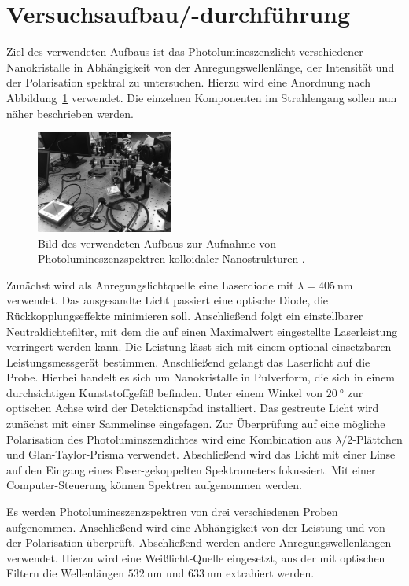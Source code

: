 \section{Versuchsaufbau/-durchführung}
Ziel des verwendeten Aufbaus ist das Photolumineszenzlicht verschiedener Nanokristalle in Abhängigkeit
von der Anregungswellenlänge, der Intensität und der Polarisation spektral zu untersuchen.
Hierzu wird eine Anordnung nach Abbildung~\ref{fig: aufbau} verwendet. Die einzelnen Komponenten
im Strahlengang sollen nun näher beschrieben werden.

\begin{figure}
  \centering
  \includegraphics[width = 0.4\textwidth]{pics/setup_pl.png}
  \caption{Bild des verwendeten Aufbaus zur Aufnahme von Photolumineszenzspektren kolloidaler
  Nanostrukturen \cite{anleitung_pl}.}
  \label{fig: aufbau}
\end{figure}

Zunächst wird als Anregungslichtquelle eine Laserdiode mit $\lambda = \SI{405}{\nano\meter}$ verwendet.
Das ausgesandte Licht passiert eine optische Diode, die Rückkopplungseffekte minimieren soll.
Anschließend folgt ein einstellbarer Neutraldichtefilter, mit dem die auf einen Maximalwert eingestellte Laserleistung
verringert werden kann. Die Leistung lässt sich mit einem optional einsetzbaren Leistungsmessgerät bestimmen.
Anschließend gelangt das Laserlicht auf die Probe. Hierbei handelt es sich um Nanokristalle in Pulverform, die sich in
einem durchsichtigen Kunststoffgefäß befinden. Unter einem Winkel von $\SI{20}{\degree}$ zur optischen Achse wird der
Detektionspfad installiert. Das gestreute Licht wird zunächst mit einer Sammelinse eingefagen. Zur Überprüfung auf eine
mögliche Polarisation des Photoluminszenzlichtes wird eine Kombination aus $\lambda / 2$-Plättchen und
Glan-Taylor-Prisma verwendet. 
Abschließend wird das Licht mit einer Linse auf den Eingang eines Faser-gekoppelten
Spektrometers fokussiert. Mit einer Computer-Steuerung können Spektren aufgenommen werden.

Es werden Photolumineszenzspektren von drei verschiedenen Proben aufgenommen. Anschließend wird eine Abhängigkeit von der
Leistung und von der Polarisation überprüft. Abschließend werden andere Anregungswellenlängen verwendet. Hierzu wird
eine Weißlicht-Quelle eingesetzt, aus der mit optischen Filtern die Wellenlängen
$\SI{532}{\nano\meter}$ und $\SI{633}{\nano\meter}$ extrahiert werden.
